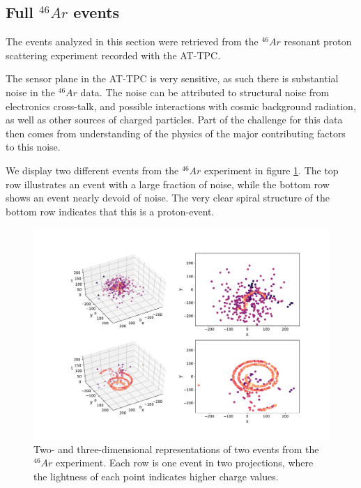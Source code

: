 \subsection{Full \texorpdfstring{${}^{46}Ar$}{46Ar}  events}\label{sec:data_real}

The events analyzed in this section were retrieved from the ${}^{46}Ar$ resonant proton scattering experiment recorded with the AT-TPC. 

The sensor plane in the AT-TPC is very sensitive, as such there is substantial noise in the ${}^{46}Ar$ data. The noise can be attributed to structural noise from electronics cross-talk, and possible interactions with cosmic background radiation, as well as other sources of charged particles. Part of the challenge for this data then comes from understanding of the physics of the major contributing factors to this noise. 

We display two different events from the ${}^{46}Ar$ experiment in figure \ref{fig:samples}. The top row illustrates an event with a large fraction of noise, while the bottom row shows an event nearly devoid of noise. The very clear spiral structure of the bottom row indicates that this is a proton-event.

\begin{figure}[H]
\centering
\includegraphics[width=\textwidth]{../plots/display_eventsfull_.pdf}
\caption[Displaying un-filtered events in 2D and 3D]{Two- and three-dimensional representations of two events from the ${}^{46}Ar$ experiment. Each row is one event in two projections, where the lightness of each point indicates higher charge values.}\label{fig:samples}
\end{figure}

